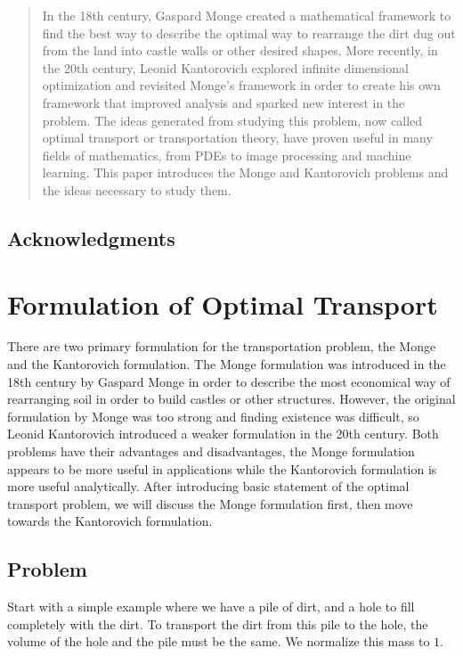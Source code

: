 \documentclass[12pt]{article}
\theoremstyle{plain}
\numberwithin{equation}{section}
\begin{document}
\begin{abstract}

In the 18th century, Gaspard Monge created a mathematical framework to find the best way to describe the optimal way to rearrange the dirt dug out from the land into castle walls or other desired shapes. 
More recently, in the 20th century, Leonid Kantorovich explored infinite dimensional optimization and revisited Monge's framework in order to create his own framework that improved analysis and sparked new interest in the problem.
The ideas generated from studying this problem, now called optimal transport or transportation theory, have proven useful in many fields of mathematics, from PDEs to image processing and machine learning. 
This paper introduces the Monge and Kantorovich problems and the ideas necessary to study them.

\end{abstract}
\newpage
\tableofcontents

\subsection*{Acknowledgments}
\newpage
\section{Formulation of Optimal Transport}
There are two primary formulation for the transportation problem, the Monge and the Kantorovich formulation. The Monge formulation was introduced in the 18th century by Gaspard Monge in order to describe the most economical way of rearranging soil in order to build castles or other structures. However, the original formulation by Monge was too strong and finding existence was difficult, so Leonid Kantorovich introduced a weaker formulation in the 20th century. 
Both problems have their advantages and disadvantages, the Monge formulation appears to be more useful in applications while the Kantorovich formulation is more useful analytically. After introducing basic statement of the optimal transport problem, we will discuss the Monge formulation first, then move towards the Kantorovich formulation.
\subsection{Problem}
Start with a simple example where we have a pile of dirt, and a hole to fill completely with the dirt.
To transport the dirt from this pile to the hole, the volume of the hole and the pile must be the same. We normalize this mass to $1$.
\end{document}
